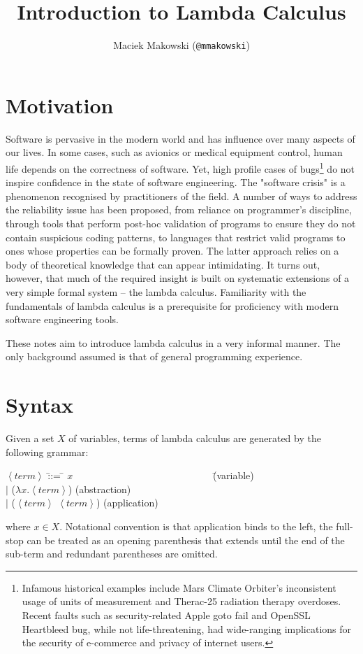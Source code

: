 \documentclass[11pt,twoside,a4paper]{article} %
\newcommand{\nonterm}[1]{$\left<#1\right>$}
\newcommand{\alt}[0]{$|$}
\begin{document}
\title{Introduction to Lambda Calculus}
\author{Maciek Makowski (\texttt{@mmakowski})}
\maketitle

\section{Motivation}

Software is pervasive in the modern world and has influence over many aspects 
of our lives. In some cases, such as avionics or medical equipment control, 
human life depends on the correctness of software. Yet, high profile cases of 
bugs\footnote{Infamous historical examples include Mars Climate 
Orbiter's inconsistent usage of units of measurement\cite{mco} and Therac-25 
radiation therapy overdoses\cite{therac25}. Recent faults such as
security-related Apple goto fail\cite{cve141266} and OpenSSL Heartbleed
bug\cite{cve140160},
while not life-threatening, had wide-ranging implications for the security of
e-commerce and privacy of internet users.} do not inspire confidence in the 
state of software engineering. The "software crisis" is a phenomenon recognised 
by practitioners of the field. A number of ways to address the reliability issue 
has been proposed, from reliance on programmer's 
discipline\cite{cleancode}\cite{securecoding}, through tools that
perform post-hoc validation of programs to ensure they do not contain suspicious
coding patterns\cite{raf04}, to languages 
that restrict valid programs to ones whose properties can be formally proven. 
The latter approach relies on a body of 
theoretical knowledge that can appear intimidating. It turns out, 
however, that much of the required insight is built on systematic extensions of 
a very simple formal system -- the lambda calculus. Familiarity with the 
fundamentals of lambda calculus is a prerequisite for proficiency with modern 
software engineering tools. 

These notes aim to introduce lambda calculus in a 
very informal manner. The only background assumed is that of general programming 
experience.

\section{Syntax}

Given a set $X$ of variables, terms of lambda calculus are generated by the 
following grammar:
\begin{tabbing}
\nonterm{term} \= ::=  \= $x$~~~~~~~~~~~~~~~~~~~~~~~~~~~~ \= (variable)    \\
               \> \alt \> ($\lambda x.$\nonterm{term})    \> (abstraction) \\
               \> \alt \> (\nonterm{term} \nonterm{term}) \> (application) \\
\end{tabbing}
where $x\in X$. Notational convention is that application binds to the left, the 
full-stop can be treated as an opening parenthesis that extends until the end of 
the sub-term and redundant parentheses are omitted. 
\end{document}
